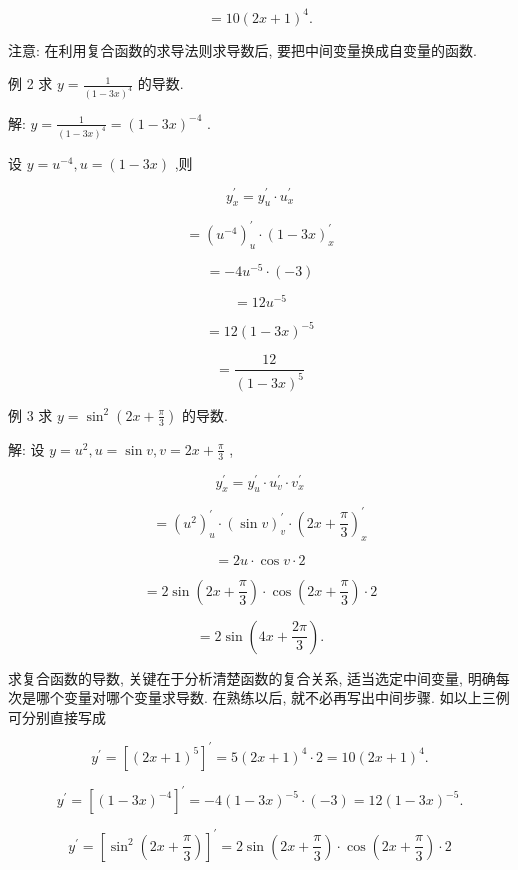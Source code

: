 \documentclass[lang=cn,newtx,10pt,scheme=chinese]{elegantbook}
\begin{document}
\[
= {10}{\left( 2x + 1\right) }^{4}\text{.}
\]

注意: 在利用复合函数的求导法则求导数后, 要把中间变量换成自变量的函数.

例 2 求 \(y = \frac{1}{{\left( 1 - 3x\right) }^{4}}\) 的导数.

解: \(y = \frac{1}{{\left( 1 - 3x\right) }^{4}} = {\left( 1 - 3x\right) }^{-4}\) .

设 \(y = {u}^{-4},u = \left( {1 - {3x}}\right)\) ,则

\[
{y}_{x}^{\prime } = {y}_{u}^{\prime } \cdot {u}_{x}^{\prime }
\]

\[
= {\left( {u}^{-4}\right) }_{u}^{\prime } \cdot {\left( 1 - 3x\right) }_{x}^{\prime }
\]

\[
= - 4{u}^{-5} \cdot \left( {-3}\right)
\]

\[
= {12}{u}^{-5}
\]

\[
= {12}{\left( 1 - 3x\right) }^{-5}
\]

\[
= \frac{12}{{\left( 1 - 3x\right) }^{5}}
\]

例 3 求 \(y = {\sin }^{2}\left( {{2x} + \frac{\pi }{3}}\right)\) 的导数.

解: 设 \(y = {u}^{2},u = \sin v,v = {2x} + \frac{\pi }{3}\) ,

\[
{y}_{x}^{\prime } = {y}_{u}^{\prime } \cdot {u}_{v}^{\prime } \cdot {v}_{x}^{\prime }
\]

\[
= {\left( {u}^{2}\right) }_{u}^{\prime } \cdot {\left( \sin v\right) }_{v}^{\prime } \cdot {\left( 2x + \frac{\pi }{3}\right) }_{x}^{\prime }
\]

\[
= {2u} \cdot \cos v \cdot 2
\]

\[
= 2\sin \left( {{2x} + \frac{\pi }{3}}\right) \cdot \cos \left( {{2x} + \frac{\pi }{3}}\right) \cdot 2
\]

\[
= 2\sin \left( {{4x} + \frac{2\pi }{3}}\right) \text{.}
\]

求复合函数的导数, 关键在于分析清楚函数的复合关系, 适当选定中间变量, 明确每次是哪个变量对哪个变量求导数. 在熟练以后, 就不必再写出中间步骤. 如以上三例可分别直接写成

\[
{y}^{\prime } = {\left\lbrack {\left( 2x + 1\right) }^{5}\right\rbrack }^{\prime } = 5{\left( 2x + 1\right) }^{4} \cdot 2 = {10}{\left( 2x + 1\right) }^{4}.
\]

\[
{y}^{\prime } = {\left\lbrack {\left( 1 - 3x\right) }^{-4}\right\rbrack }^{\prime } = - 4{\left( 1 - 3x\right) }^{-5} \cdot \left( {-3}\right) = {12}{\left( 1 - 3x\right) }^{-5}.
\]

\[
{y}^{\prime } = {\left\lbrack {\sin }^{2}\left( 2x + \frac{\pi }{3}\right) \right\rbrack }^{\prime } = 2\sin \left( {{2x} + \frac{\pi }{3}}\right) \cdot \cos \left( {{2x} + \frac{\pi }{3}}\right) \cdot 2
\]
\end{document}
